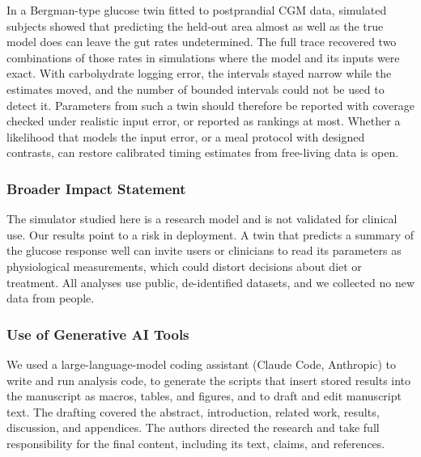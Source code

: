 In a Bergman-type glucose twin fitted to postprandial CGM data, simulated subjects showed that predicting the held-out area almost as well as the true model does can leave the gut rates undetermined.
The full trace recovered two combinations of those rates in simulations where the model and its inputs were exact.
With carbohydrate logging error, the intervals stayed narrow while the estimates moved, and the number of bounded intervals could not be used to detect it.
Parameters from such a twin should therefore be reported with coverage checked under realistic input error, or reported as rankings at most.
Whether a likelihood that models the input error, or a meal protocol with designed contrasts, can restore calibrated timing estimates from free-living data is open.

\subsubsection*{Broader Impact Statement}
The simulator studied here is a research model and is not validated for clinical use.
Our results point to a risk in deployment.
A twin that predicts a summary of the glucose response well can invite users or clinicians to read its parameters as physiological measurements, which could distort decisions about diet or treatment.
All analyses use public, de-identified datasets, and we collected no new data from people.

\subsubsection*{Use of Generative AI Tools}
We used a large-language-model coding assistant (Claude Code, Anthropic) to write and run analysis code, to generate the scripts that insert stored results into the manuscript as macros, tables, and figures, and to draft and edit manuscript text.
The drafting covered the abstract, introduction, related work, results, discussion, and appendices.
The authors directed the research and take full responsibility for the final content, including its text, claims, and references.
